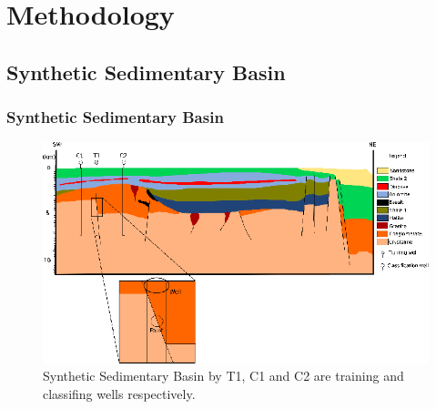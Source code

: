 \documentclass[aspectratio=10]{beamer} %
\begin{document}
\section{Methodology}

\subsection{Synthetic Sedimentary Basin}

\begin{frame}
	\frametitle{Synthetic Sedimentary Basin}
	\begin{figure}[H]
		\centering
		\includegraphics[scale=0.34]{Imagens/Basin.eps}
		\caption{Synthetic Sedimentary Basin by \cite{Sal2008}  T1, C1 and C2 are training and classifing wells respectively.}
		\label{Model}
	\end{figure}
\end{frame}
\end{document}
